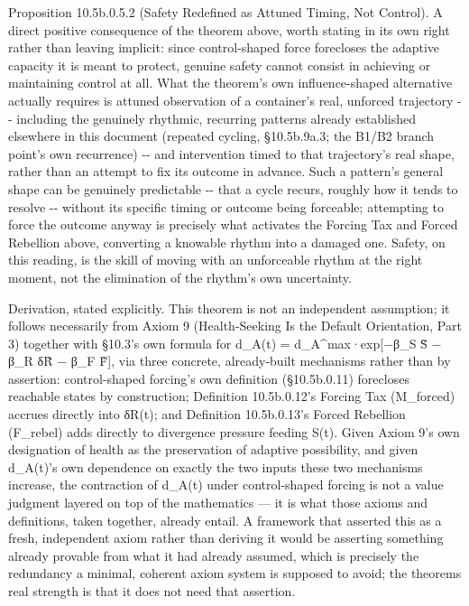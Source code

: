 \documentclass[
]{article}
\begin{document}
Proposition 10.5b.0.5.2 (Safety Redefined as Attuned Timing, Not
Control). A direct positive consequence of the theorem above, worth
stating in its own right rather than leaving implicit: since
control-shaped force forecloses the adaptive capacity it is meant to
protect, genuine safety cannot consist in achieving or maintaining
control at all. What the theorem's own influence-shaped alternative
actually requires is attuned observation of a container's real, unforced
trajectory -\/- including the genuinely rhythmic, recurring patterns
already established elsewhere in this document (repeated cycling,
§10.5b.9a.3; the B1/B2 branch point's own recurrence) -\/- and
intervention timed to that trajectory's real shape, rather than an
attempt to fix its outcome in advance. Such a pattern's general shape
can be genuinely predictable -\/- that a cycle recurs, roughly how it
tends to resolve -\/- without its specific timing or outcome being
forceable; attempting to force the outcome anyway is precisely what
activates the Forcing Tax and Forced Rebellion above, converting a
knowable rhythm into a damaged one. Safety, on this reading, is the
skill of moving with an unforceable rhythm at the right moment, not the
elimination of the rhythm's own uncertainty.

Derivation, stated explicitly. This theorem is not an independent
assumption; it follows necessarily from Axiom 9 (Health-Seeking Is the
Default Orientation, Part 3) together with §10.3's own formula for
d\_A(t) = d\_A\^{}max·exp{[}−β\_S S̃ − β\_R δR̃ − β\_F F̃{]}, via three
concrete, already-built mechanisms rather than by assertion:
control-shaped forcing's own definition (§10.5b.0.11) forecloses
reachable states by construction; Definition 10.5b.0.12's Forcing Tax
(M\_forced) accrues directly into δR(t); and Definition 10.5b.0.13's
Forced Rebellion (F\_rebel) adds directly to divergence pressure feeding
S(t). Given Axiom 9's own designation of health as the preservation of
adaptive possibility, and given d\_A(t)'s own dependence on exactly the
two inputs these two mechanisms increase, the contraction of d\_A(t)
under control-shaped forcing is not a value judgment layered on top of
the mathematics --- it is what those axioms and definitions, taken
together, already entail. A framework that asserted this as a fresh,
independent axiom rather than deriving it would be asserting something
already provable from what it had already assumed, which is precisely
the redundancy a minimal, coherent axiom system is supposed to avoid;
the theorems real strength is that it does not need that assertion.
\end{document}
